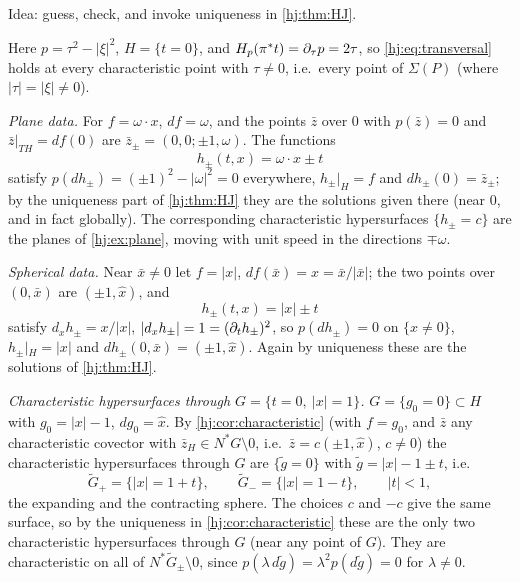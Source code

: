 \subsection*{}
Idea: guess, check, and invoke uniqueness in \cref{hj:thm:HJ}.

Here $p=\tau^2-|\xi|^2$, $H=\{t=0\}$, and $H_p(\pi^*t)=\partial_\tau p=2\tau$, so
\eqref{hj:eq:transversal} holds at every characteristic point with $\tau\ne0$, i.e.\ every
point of $\Sigma(P)$ (where $|\tau|=|\xi|\ne0$).

\emph{Plane data.} For $f=\omega\cdot x$, $df=\omega$, and the points $\bar z$ over $0$ with
$p(\bar z)=0$ and $\bar z|_{TH}=df(0)$ are $\bar z_\pm=(0,0;\pm1,\omega)$. The functions
\begin{equation*}
h_\pm(t,x)=\omega\cdot x\pm t
\end{equation*}
satisfy $p(dh_\pm)=(\pm1)^2-|\omega|^2=0$ everywhere, $h_\pm|_H=f$ and $dh_\pm(0)=\bar z_\pm$;
by the uniqueness part of \cref{hj:thm:HJ} they are the solutions given there (near $0$, and
in fact globally). The corresponding characteristic hypersurfaces $\{h_\pm=c\}$ are the
planes of \cref{hj:ex:plane}, moving with unit speed in the directions $\mp\omega$.

\emph{Spherical data.} Near $\bar x\ne0$ let $f=|x|$, $df(\bar x)=\hat x=\bar x/|\bar x|$; the
two points over $(0,\bar x)$ are $(\pm1,\hat x)$, and
\begin{equation*}
h_\pm(t,x)=|x|\pm t
\end{equation*}
satisfy $d_xh_\pm=x/|x|$, $|d_xh_\pm|=1=(\partial_th_\pm)^2$, so $p(dh_\pm)=0$ on $\{x\ne0\}$,
$h_\pm|_H=|x|$ and $dh_\pm(0,\bar x)=(\pm1,\hat x)$. Again by uniqueness these are the
solutions of \cref{hj:thm:HJ}.

\emph{Characteristic hypersurfaces through $G=\{t=0,\ |x|=1\}$.} $G=\{g_0=0\}\subset H$ with
$g_0=|x|-1$, $dg_0=\hat x$. By \cref{hj:cor:characteristic} (with $f=g_0$, and $\bar z$ any
characteristic covector with $\bar z_H\in N^*G\setminus0$, i.e.\ $\bar z=c(\pm1,\hat x)$,
$c\neq0$) the characteristic hypersurfaces through $G$ are $\{\tilde g=0\}$ with
$\tilde g=|x|-1\pm t$, i.e.
\begin{equation*}
\tilde G_+=\{|x|=1+t\},\qquad\tilde G_-=\{|x|=1-t\},\qquad|t|<1,
\end{equation*}
the expanding and the contracting sphere. The choices $c$ and $-c$ give the same surface, so
by the uniqueness in \cref{hj:cor:characteristic} these are the only two characteristic
hypersurfaces through $G$ (near any point of $G$). They are characteristic on all of
$N^*\tilde G_\pm\setminus0$, since $p(\lambda\,d\tilde g)=\lambda^2p(d\tilde g)=0$ for
$\lambda\ne0$.

